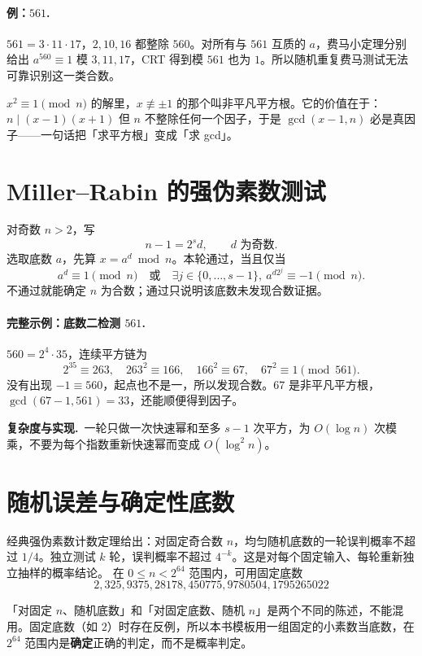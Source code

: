 \documentclass[UTF8,a4paper,11pt,twoside,openright,fontset=fandol]{ctexbook}
\theoremstyle{definition}
\newcommand{\cost}{\par\noindent\textbf{复杂度与实现.}\ }
\begin{document}
\paragraph{例：$561$.} $561=3\cdot11\cdot17$，$2,10,16$ 都整除 $560$。对所有与 $561$ 互质的 $a$，费马小定理分别给出 $a^{560}\equiv1$ 模 $3,11,17$，CRT 得到模 $561$ 也为 $1$。所以随机重复费马测试无法可靠识别这一类合数。
\begin{tip}[词义：非平凡平方根]
$x^2\equiv1\pmod n$ 的解里，$x\not\equiv\pm1$ 的那个叫非平凡平方根。它的价值在于：$n\mid(x-1)(x+1)$ 但 $n$ 不整除任何一个因子，于是 $\gcd(x-1,n)$ 必是真因子——一句话把「求平方根」变成「求 gcd」。
\end{tip}



\section{Miller--Rabin 的强伪素数测试}
对奇数 $n>2$，写
\[
 n-1=2^s d,\qquad d\text{ 为奇数}.
\]
选取底数 $a$，先算 $x=a^d\bmod n$。本轮通过，当且仅当
\[
 a^d\equiv1\pmod n
 \quad\text{或}\quad
 \exists j\in\{0,\ldots,s-1\},\ a^{d2^j}\equiv-1\pmod n.
\]
不通过就能确定 $n$ 为合数；通过只说明该底数未发现合数证据。


\paragraph{完整示例：底数二检测 $561$.}
$560=2^4\cdot35$，连续平方链为
\[
 2^{35}\equiv263,\quad263^2\equiv166,\quad166^2\equiv67,\quad67^2\equiv1\pmod{561}.
\]
没有出现 $-1\equiv560$，起点也不是一，所以发现合数。$67$ 是非平凡平方根，$\gcd(67-1,561)=33$，还能顺便得到因子。
\cost 一轮只做一次快速幂和至多 $s-1$ 次平方，为 $O(\log n)$ 次模乘，不要为每个指数重新快速幂而变成 $O(\log^2n)$。


\section{随机误差与确定性底数}
经典强伪素数计数定理给出：对固定奇合数 $n$，均匀随机底数的一轮误判概率不超过 $1/4$。独立测试 $k$ 轮，误判概率不超过 $4^{-k}$。这是对每个固定输入、每轮重新独立抽样的概率结论。
在 $0\le n<2^{64}$ 范围内，可用固定底数
\[
 2,325,9375,28178,450775,9780504,1795265022
\]

\begin{tip}[口径：随机的是底数还是模数]
「对固定 $n$、随机底数」和「对固定底数、随机 $n$」是两个不同的陈述，不能混用。固定底数（如 $2$）时存在反例，所以本书模板用一组固定的小素数当底数，在 $2^{64}$ 范围内是\textbf{确定}正确的判定，而不是概率判定。
\end{tip}
\end{document}
